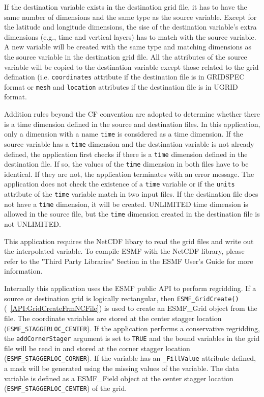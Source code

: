If the destination 
variable exists in the destination grid file, it has to have the same number of dimensions and the same type as the source variable. Except for the latitude and longitude dimensions, the sise of 
the destination variable's extra dimensions (e.g., time and vertical layers) has to match with the 
source variable.   A
new variable will be created with the same type and matching dimensions as the source variable in the destination grid file.
All the attributes of the source variable will be copied to the destination variable except those
related to the grid defination (i.e. {\tt coordinates} attribute if the destination file is in  
GRIDSPEC format or {\tt mesh} and {\tt location} attributes if the destination file is in UGRID format.

Addition rules beyond the CF convention are adopted to determine whether there is a time dimension defined
in the source and destination files.  In this application, only a dimension with a name {\tt time} is 
considered as a time dimension.
If the source variable has a {\tt time} dimension and the destination variable is not already defined, 
the application first checks if there is a {\tt time} dimension defined in the destination file.  If so, 
the values of the {\tt time} dimension in both files have to be identical.  If they are not, the application
terminates with an error message.  The application does not check the existence of a {\tt time} variable 
or if the {\tt units} attribute of the {\tt time} variable match in two input files.  If the destination 
file does not have a {\tt time} dimension, it will be created.  UNLIMITED time dimension is allowed in the
source file, but the {\tt time} dimension created in the destination file is not UNLIMITED.

This application requires the NetCDF libary to read the grid files and write out the interpolated variable.  To compile ESMF with
the NetCDF library, please refer to the "Third Party Libraries" Section in the ESMF User's Guide for more information.

Internally this application uses the ESMF public API to perform regridding.
If a source or destination grid is logically rectangular, then {\tt ESMF\_GridCreate()}(~\ref{API:GridCreateFrmNCFile}) is used to create an ESMF\_Grid object from the file. The coordinate variables are stored
at the center stagger location ({\tt ESMF\_STAGGERLOC\_CENTER}).  If the application performs a 
conservative regridding, the {\tt addCornerStager} argument is set to {\tt TRUE} and the bound variables in the grid file will
be read  in and stored at the corner stagger location ({\tt ESMF\_STAGGERLOC\_CORNER}).  If the variable has an {\tt \_FillValue} attribute defined, a mask will be generated using the missing values of the variable. 
The data variable is defined as a ESMF\_Field object at the center stagger location ({\tt ESMF\_STAGGERLOC\_CENTER}) of the grid.   

